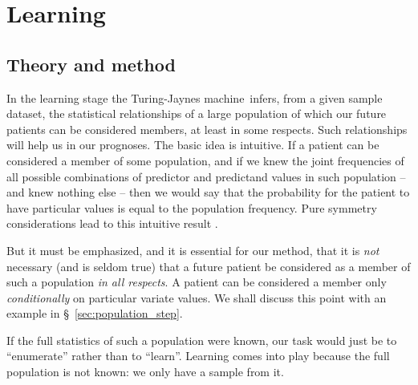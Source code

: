 \documentclass[utf8]{FrontiersinHarvard} %
\newcommand*{\sect}{\S}%
\newcommand*{\sects}{\S\S}%
\renewcommand*{\|}[1][]{\nonscript\:#1\vert\nonscript\:\mathopen{}}
\newcommand*{\tjm}{Turing-Jaynes machine}
\begin{document}
\section{Learning}
\label{sec:learning_step}

\subsection{Theory and method}
\label{sec:learning_theory}

In the learning stage the \tjm\ infers, from a given sample dataset, the statistical relationships of a large population of which our future patients can be considered members, at least in some respects. Such relationships will help us in our prognoses. The basic idea is intuitive. If a patient can be considered a member of some population, and if we knew the joint frequencies of all possible combinations of predictor and predictand values in such population -- and knew nothing else -- then we would say that the probability for the patient to have particular values is equal to the population frequency. Pure symmetry considerations lead to this intuitive result \citep[\sects~4.2--4.3]{definetti1930,dawid2013,bernardoetal1994_r2000}.

But it must be emphasized, and it is essential for our method, that it is \emph{not} necessary (and is seldom true) that a future patient be considered as a member of such a population \emph{in all respects}. A patient can be considered a member only \emph{conditionally} on particular variate values. We shall discuss this point with an example in \sect~\ref{sec:population_step}.

If the full statistics of such a population were known, our task would just be to \enquote{enumerate} rather than to \enquote{learn}. Learning comes into play because the full population is not known: we only have a sample from it.
\end{document}
